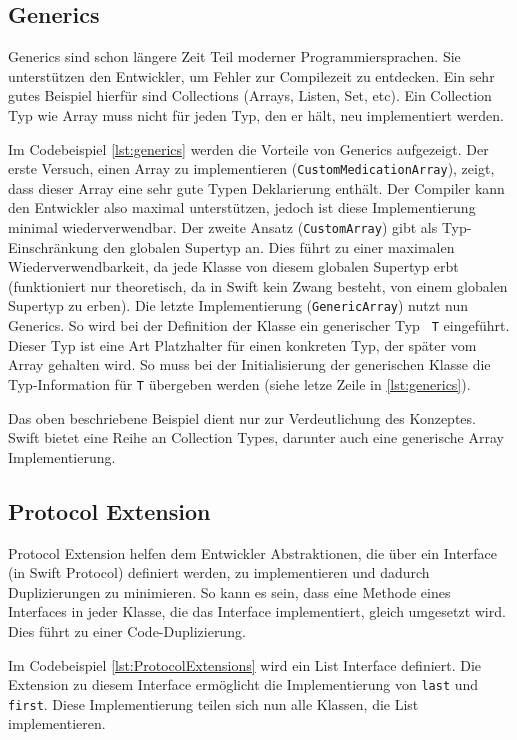 \subsection*{Generics}
Generics sind schon längere Zeit Teil moderner Programmiersprachen. Sie unterstützen den Entwickler, um Fehler zur Compilezeit zu entdecken. Ein sehr gutes Beispiel hierfür sind Collections (Arrays, Listen, Set, etc). Ein Collection Typ wie Array muss nicht für jeden Typ, den er hält, neu implementiert werden.

Im Codebeispiel \ref{lst:generics} werden die Vorteile von Generics aufgezeigt. Der erste Versuch, einen Array zu implementieren (\lstinline{CustomMedicationArray}), zeigt, dass dieser Array eine sehr gute Typen Deklarierung enthält. Der Compiler kann den Entwickler also maximal unterstützen, jedoch ist diese Implementierung minimal wiederverwendbar. Der zweite Ansatz (\lstinline{CustomArray}) gibt als Typ-Einschränkung den globalen Supertyp an. Dies führt zu einer maximalen Wiederverwendbarkeit, da jede Klasse von diesem globalen Supertyp erbt (funktioniert nur theoretisch, da in Swift kein Zwang besteht, von einem globalen Supertyp zu erben).
Die letzte Implementierung (\lstinline{GenericArray}) nutzt nun Generics. So wird bei der Definition der Klasse ein generischer Typ \lstinline{ T}  eingeführt. Dieser Typ ist eine Art Platzhalter für einen konkreten Typ, der später vom Array gehalten wird. So muss bei der Initialisierung der generischen Klasse die Typ-Information für \lstinline{T} übergeben werden (siehe letze Zeile in \ref{lst:generics}).

Das oben beschriebene Beispiel dient nur zur Verdeutlichung des Konzeptes. Swift bietet eine Reihe an Collection Types, darunter auch eine generische Array Implementierung. 

\subsection*{Protocol Extension}
Protocol Extension helfen dem Entwickler Abstraktionen, die über ein Interface (in Swift Protocol) definiert werden, zu implementieren und dadurch Duplizierungen zu minimieren. So kann es sein, dass eine Methode eines Interfaces in jeder Klasse, die das Interface implementiert, gleich umgesetzt wird. Dies führt zu einer Code-Duplizierung. 

Im Codebeispiel \ref{lst:ProtocolExtensions} wird ein List Interface definiert. Die Extension zu diesem Interface ermöglicht die Implementierung von \lstinline{last}  und \lstinline{first}. Diese Implementierung teilen sich nun alle Klassen, die List implementieren.

